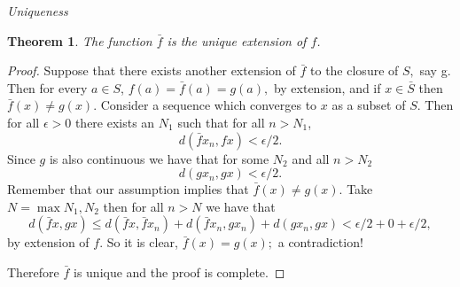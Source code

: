 \documentclass[letter]{article}
\newtheorem{theorem}{Theorem}
\newenvironment{menumerate}{%
  \edef\backupindent{\the\parindent}%
  \enumerate%
  \setlength{\parindent}{\backupindent}%
}{\endenumerate}
\begin{document}
\begin{menumerate}
\begin{menumerate}
				\item \emph{Uniqueness}
					\begin{theorem}
						The function $\bar f$ is the unique extension of $f$.
					\end{theorem}
					\begin{proof}
						Suppose that there exists another extension of $\bar f$ to the closure of $S,$ say g. Then for every $a \in S$, $f(a) = \bar f(a) = g(a),$ by extension, and if $x \in \bar S$ then $\bar f(x) \neq g(x).$ Consider a sequence which converges to $x$ as a subset of $S$. Then for all $\epsilon > 0$ there exists an $N_1$ such that for all $n > N_1$, $$d(\bar fx_n, fx) < \epsilon/2.$$ Since $g$ is also continuous we have that for some $N_2$ and all $n> N_2$ $$d(gx_n,gx) < \epsilon/2.$$ Remember that our assumption implies that $\bar f(x) \neq g(x).$ Take $N = \max{N_1, N_2}$ then for all $n > N$ we have that 
						$$d(\bar fx,gx) \leq d(\bar fx, \bar fx_n) + d(\bar fx_n, gx_n) + d(gx_n, gx) < \epsilon/2 + 0 + \epsilon/2,$$
						by extension of $f.$ So it is clear, $\bar f(x) = g(x);$ a contradiction!

						Therefore $\bar f$ is unique and the proof is complete.
					\end{proof}
			\end{menumerate}

	\end{menumerate}
\end{document}
